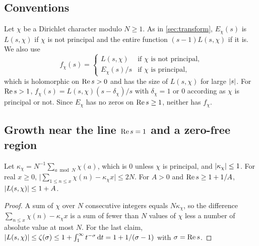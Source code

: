 
\subsection{Conventions}\label{ss:B-analytic-intro}
Let $\chi$ be a Dirichlet character modulo $N\ge1$. As in \cref{sec:transform}, $E_\chi(s)$ is
$L(s,\chi)$ if $\chi$ is not principal and the entire function $(s-1)L(s,\chi)$ if it is. We also use
\[
  f_\chi(s)=
  \begin{cases}
    L(s,\chi) & \text{if $\chi$ is not principal,}\\
    E_\chi(s)/s & \text{if $\chi$ is principal,}
  \end{cases}
\]
which is holomorphic on $\operatorname{Re} s>0$ and has the size of $L(s,\chi)$ for large $\lvert s\rvert$. For
$\operatorname{Re} s>1$, $f_\chi(s)=L(s,\chi)(s-\delta_\chi)/s$ with $\delta_\chi=1$ or $0$ according as $\chi$ is
principal or not. Since $E_\chi$ has no zeros on $\operatorname{Re} s\ge1$, neither has $f_\chi$.

\subsection{Growth near the line \texorpdfstring{$\operatorname{Re} s=1$}{Re s = 1} and a zero-free region}\label{ss:B-zero-free}

\begin{lemma}\label{lem:B-partial-sums}
Let $\kappa_\chi=N^{-1}\sum_{a\bmod N}\chi(a)$, which is $0$ unless $\chi$ is principal, and
$\lvert \kappa_\chi\rvert\le1$. For real $x\ge0$, $\bigl\lvert\sum_{1\le n\le x}\chi(n)-\kappa_\chi x\bigr\rvert\le2N$.
For $A>0$ and $\operatorname{Re} s\ge1+1/A$, $\lvert L(s,\chi)\rvert\le1+A$.
\end{lemma}

\begin{proof}
A sum of $\chi$ over $N$ consecutive integers equals $N\kappa_\chi$, so the difference
$\sum_{n\le x}\chi(n)-\kappa_\chi x$ is a sum of fewer than $N$ values of $\chi$ less a number of
absolute value at most $N$. For the last claim, $\lvert L(s,\chi)\rvert\le\zeta(\sigma)\le1+\int_1^\infty
t^{-\sigma}\mathop{}\!\mathrm{d} t=1+1/(\sigma-1)$ with $\sigma=\operatorname{Re} s$.
\end{proof}

